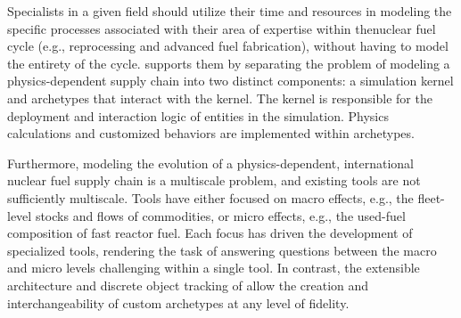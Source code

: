 Specialists in a given field should utilize their time and resources in 
modeling the specific processes associated with their area of expertise within 
thenuclear fuel cycle (e.g., reprocessing and advanced
fuel fabrication), without having to model the entirety of the cycle.
\Cyclus supports them by separating the problem of modeling a
physics-dependent supply chain into two distinct components: a simulation kernel and archetypes that
interact with the kernel. The kernel is responsible for the
deployment and interaction logic of entities in the simulation.  Physics calculations and 
customized behaviors are implemented within archetypes. 

Furthermore, modeling the evolution of a physics-dependent, international nuclear fuel supply
chain is a multiscale problem, and existing tools are not sufficiently 
multiscale. Tools have either focused on macro effects, e.g., the fleet-level
stocks and flows of commodities, or micro effects, e.g., the used-fuel
composition of fast reactor fuel. Each focus has driven the
development of specialized tools, rendering the task of answering questions between
the macro and micro levels challenging within a single tool. 
In contrast, the extensible architecture and discrete object tracking of \Cyclus allow
the creation and interchangeability of custom archetypes at any level of fidelity.
